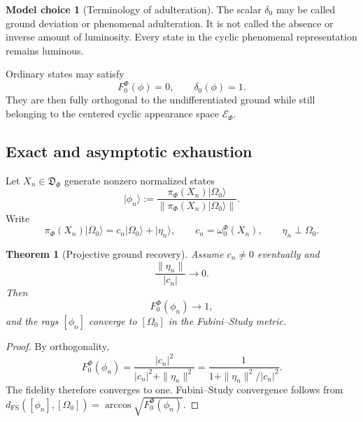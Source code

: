 \documentclass[11pt,reqno]{scrartcl}
\newcommand{\piF}{\pi_{\Phi}}
\newcommand{\omegaF}{\omega_{0}^{\Phi}}
\newcommand{\ket}[1]{\lvert #1\rangle}
\newcommand{\detAlg}{\mathfrak D_{\Phi}}
\newcommand{\appSpace}{\mathscr E_{\Phi}}
\theoremstyle{plain}
\newtheorem{theorem}{Theorem}[section]
\theoremstyle{definition}
\newtheorem{modelchoice}[modelchoice]{Model choice}
\theoremstyle{remark}
\begin{document}
\begin{modelchoice}[Terminology of adulteration]
\label{choice:adulteration-terminology}
The scalar $\delta_0$ may be called ground deviation or phenomenal
adulteration.  It is not called the absence or inverse amount of luminosity.
Every state in the cyclic phenomenal representation remains luminous.
\end{modelchoice}

Ordinary states may satisfy
\begin{equation}
  F_0^{\Phi}(\phi)=0,
  \qquad
  \delta_0(\phi)=1.
  \label{eq:fully-ground-orthogonal-sems}
\end{equation}
They are then fully orthogonal to the undifferentiated ground while still
belonging to the centered cyclic appearance space $\appSpace$.

\subsection{Exact and asymptotic exhaustion}

Let $X_n\in\detAlg$ generate nonzero normalized states
\begin{equation}
  \ket{\phi_n}
  :=\frac{\piF(X_n)\ket{\Omega_0}}
          {\|\piF(X_n)\ket{\Omega_0}\|}.
  \label{eq:deconditioning-state-sequence}
\end{equation}
Write
\begin{equation}
  \piF(X_n)\ket{\Omega_0}
  =c_n\ket{\Omega_0}+\ket{\eta_n},
  \qquad
  c_n=\omegaF(X_n),
  \qquad
  \eta_n\perp\Omega_0.
  \label{eq:deconditioning-ground-content-split}
\end{equation}

\begin{theorem}[Projective ground recovery]
\label{thm:projective-ground-recovery}
Assume $c_n\neq0$ eventually and
\begin{equation}
  \frac{\|\eta_n\|}{|c_n|}\longrightarrow0.
  \label{eq:ground-recovery-ratio}
\end{equation}
Then
\begin{equation}
  F_0^{\Phi}(\phi_n)\longrightarrow1,
  \label{eq:ground-recovery-fidelity}
\end{equation}
and the rays $[\phi_n]$ converge to $[\Omega_0]$ in the Fubini--Study metric.
\end{theorem}

\begin{proof}
By orthogonality,
\begin{equation}
  F_0^{\Phi}(\phi_n)
  =\frac{|c_n|^2}{|c_n|^2+\|\eta_n\|^2}
  =\frac{1}{1+\|\eta_n\|^2/|c_n|^2}.
\end{equation}
The fidelity therefore converges to one.  Fubini--Study convergence follows
from
$d_{\mathrm{FS}}([\phi_n],[\Omega_0])
=\arccos\sqrt{F_0^{\Phi}(\phi_n)}$.
\end{proof}
\end{document}
